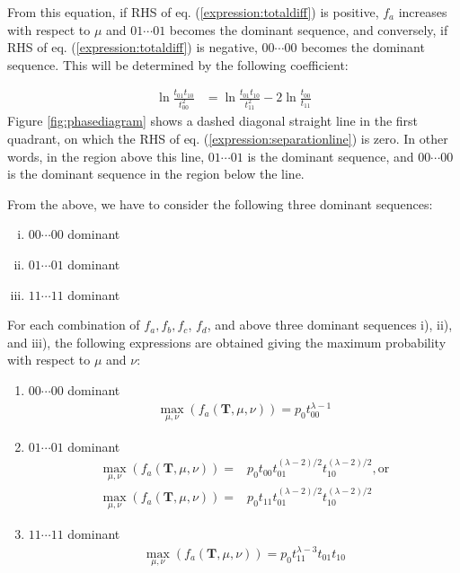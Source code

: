 ﻿\documentclass[a3paper,xelatex,english]{bxjsarticle}
\newcommand\mib[1]{\boldsymbol{#1}}
\begin{document}
From this equation, if RHS of eq. (\ref{expression:totaldiff}) is positive, $f_{a}$ increases with respect to $\mu$ and $01 \cdots 01$ becomes the dominant sequence, and conversely, if RHS of eq. (\ref{expression:totaldiff}) is negative, $00 \cdots 00$ becomes the dominant sequence.
This will be determined by the following coefficient:

\begin{align}
	\ln \frac{t_{01}t_{10}}{t_{00}^{2}} 
	&= 
	\ln \frac{t_{01}t_{10}}{t_{11}^{2}} - 2 \ln \frac{t_{00}}{t_{11}}
	\label{expression:separationline}
\end{align}
Figure \ref{fig:phasediagram} shows a dashed diagonal straight line in the first quadrant, on which the RHS of eq. (\ref{expression:separationline}) is zero.  
In other words, in the region above this line, $01 \cdots 01$ is the dominant sequence, and $00 \cdots 00$ is the dominant sequence in the region below the line. 


From the above, we have to consider the following three dominant sequences:
\begin{enumerate}[i)]
	\item $00 \cdots 00$ dominant 
	\item $01 \cdots 01$ dominant 
	\item $11 \cdots 11$ dominant 
\end{enumerate}
For each combination of $f_a, f_b, f_c$, $f_d$, and above three dominant sequences i), ii), and iii), 
the following expressions are obtained giving the maximum probability with respect to $\mu$ and $\nu$:

\begin{enumerate}[{a)}-i)]
	\item $00 \cdots 00$ dominant 
	\begin{align}
	\max_{\mu, \nu}(f_{a}(\mib{T}, \mu, \nu)) = p_{0} t_{00}^{\lambda - 1}
	\end{align}
	\item $01 \cdots 01$ dominant 
	\begin{align}
	\max_{\mu, \nu}(f_{a}(\mib{T}, \mu, \nu)) = & p_{0} t_{00} t_{01}^{(\lambda - 2) / 2} t_{10}^{(\lambda - 2) / 2}, {\textrm{or}} \\
	\max_{\mu, \nu}(f_{a}(\mib{T}, \mu, \nu)) = & p_{0} t_{11} t_{01}^{(\lambda - 2) / 2} t_{10}^{(\lambda - 2) / 2}
	\end{align}
	\item $11 \cdots 11$ dominant 
	\begin{align}
	\max_{\mu, \nu}(f_{a}(\mib{T}, \mu, \nu)) = p_{0} t_{11}^{\lambda - 3} t_{01} t_{10} \label{expression:neg1}
	\end{align}
\end{enumerate}
\end{document}
